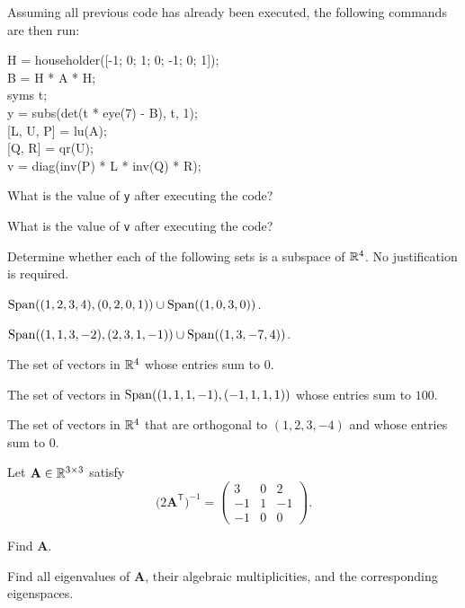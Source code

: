 \documentclass[11pt,oneside]{article}
\begin{document}
\begin{problem}
Assuming all previous code has already been executed, the following commands are then run:

{\small\ttfamily
\begin{tabbing}
H = householder([-1; 0; 1; 0; -1; 0; 1]);\\
B = H * A * H;\\
syms t;\\
y = subs(det(t * eye(7) - B), t, 1);\\
{}[L, U, P] = lu(A);\\
{}[Q, R] = qr(U);\\
v = diag(inv(P) * L * inv(Q) * R);
\end{tabbing}
}

\begin{problemsubparts}[resume]
\item What is the value of \texttt{y} after executing the code?
\item What is the value of \texttt{v} after executing the code?
\end{problemsubparts}
\end{problem}


\begin{problem}
Determine whether each of the following sets is a subspace of $\mathbb{R}^4$. No justification is required.
\begin{problemchoices}
\item $\operatorname{Span}((1,2,3,4),(0,2,0,1))\cup\operatorname{Span}((1,0,3,0))$.
\item $\operatorname{Span}((1,1,3,-2),(2,3,1,-1))\cup\operatorname{Span}((1,3,-7,4))$.
\item The set of vectors in $\mathbb{R}^4$ whose entries sum to $0$.
\item The set of vectors in $\operatorname{Span}((1,1,1,-1),(-1,1,1,1))$ whose entries sum to $100$.
\item The set of vectors in $\mathbb{R}^4$ that are orthogonal to $(1,2,3,-4)$ and whose entries sum to $0$.
\end{problemchoices}
\end{problem}

\begin{problem}
Let $\mathbf A\in\mathbb{R}^{3\times3}$ satisfy
\[
\bigl(2\mathbf A^{\mathsf T}\bigr)^{-1}=
\begin{pmatrix}
3&0&2\\
-1&1&-1\\
-1&0&0
\end{pmatrix}.
\]
\begin{problemsubparts}
\item Find $\mathbf A$.
\item Find all eigenvalues of $\mathbf A$, their algebraic multiplicities, and the corresponding eigenspaces.
\end{problemsubparts}
\end{problem}
\end{document}
